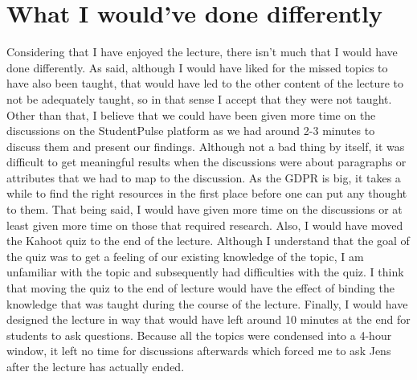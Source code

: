 \documentclass[12pt]{article}
\begin{document}
\section{What I would've done differently}
Considering that I have enjoyed the lecture, there isn't much that I would have done differently.
\newline
As said, although I would have liked for the missed topics to have also been taught, that would have led to the other content of the lecture to not be adequately taught, so in that sense I accept that they were not taught.
\newline
Other than that, I believe that we could have been given more time on the discussions on the StudentPulse platform as we had around 2-3 minutes to discuss them and present our findings. Although not a bad thing by itself, it was difficult to get meaningful results when the discussions were about paragraphs or attributes that we had to map to the discussion. As the GDPR is big, it takes a while to find the right resources in the first place before one can put any thought to them. That being said, I would have given more time on the discussions or at least given more time on those that required research.
\newline
Also, I would have moved the Kahoot quiz to the end of the lecture. Although I understand that the goal of the quiz was to get a feeling of our existing knowledge of the topic, I am unfamiliar with the topic and subsequently had difficulties with the quiz. I think that moving the quiz to the end of lecture would have the effect of binding the knowledge that was taught during the course of the lecture.
\newline
Finally, I would have designed the lecture in way that would have left around 10 minutes at the end for students to ask questions. Because all the topics were condensed into a 4-hour window, it left no time for discussions afterwards which forced me to ask Jens after the lecture has actually ended.
\end{document}
